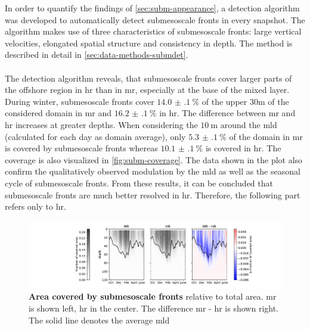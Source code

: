 In order to quantify the findings of \autoref{sec:subm-appearance}, a detection algorithm was developed to automatically detect submesoscale fronts in every snapshot. The algorithm makes use of three characteristics of submesoscale fronts: large vertical velocities, elongated spatial structure and consistency in depth. The method is described in detail in \autoref{sec:data-methods-submdet}.\\
\\
The detection algorithm reveals, that submesoscale fronts cover larger parts of the offshore region in \ac{hr} than in \ac{mr}, especially at the base of the mixed layer. During winter, submesoscale fronts cover $\SI[separate-uncertainty]{14.0(1)}{\percent}$ of the upper $30\text{m}$ of the considered domain in \ac{mr} and $\SI[separate-uncertainty]{16.2(1)}{\percent}$ in \ac{hr}. The difference between \ac{mr} and \ac{hr} increases at greater depths. When considering the $\SI{10}{\metre}$ around the \ac{mld} (calculated for each day as domain average), only $\SI[separate-uncertainty]{5.3(1)}{\percent}$ of the domain in \ac{mr} is covered by submesoscale fronts whereas $\SI[separate-uncertainty]{10.1(1)}{\percent}$ is covered in \ac{hr}. The coverage is also visualized in \autoref{fig:subm-coverage}. The data shown in the plot also confirm the qualitatively observed modulation by the \ac{mld} as well as the seasonal cycle of submesoscale fronts. From these results, it can be concluded that submesoscale fronts are much better resolved in \ac{hr}. Therefore, the following part refers only to \ac{hr}.\\
\begin{figure}[h]
    \centering
    \hspace*{-0.17cm}\includegraphics[width=17cm, trim=6cm 0 0 0]{../figures/result_subm_coverage.pdf}
    \caption[Area covered by submesoscale fronts]{\textbf{Area covered by submesoscale fronts} relative to total area. \ac{mr} is shown left, \ac{hr} in the center. The difference \ac{mr} - \ac{hr} is shown right. The solid line denotes the average \ac{mld}}\label{fig:subm-coverage}
\end{figure}
\\

